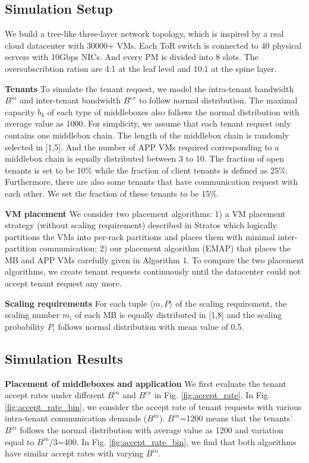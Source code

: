 \documentclass[review]{elsarticle}
\begin{document}
\subsection{Simulation Setup}
We build a tree-like three-layer network topology, which is inspired by a real cloud datacenter with 30000+ VMs. Each ToR switch is connected to 40 physical servers with 10Gbps NICs. And every PM is divided into 8 slots. The oversubscribtion ration are 4:1 at the leaf level and 10:1 at the spine layer.  

\textbf{Tenants} To simulate the tenant request, we model the intra-tenant bandwidth $B^{in}$ and inter-tenant bandwidth $B^{ex}$ to follow normal distribution. The maximal capacity $b_k$ of each type of middleboxes also follows the normal distribution with average value as 1000. For simplicity, we assume that each tenant request only contains one middlebox chain. The length of the middlebox chain is randomly selected in [1,5]. And the number of APP VMs required corresponding to a middlebox chain is equally distributed between 3 to 10. The fraction of open tenants is set to be 10\% while the fraction of client tenants is defined as 25\%. Furthermore, there are also some tenants that have communication request with each other. We set the fraction of these tenants to be 15\%.  

\textbf{VM placement} We consider two placement algorithms: 1) a VM placement strategy (without scaling requirement) described in Stratos \cite{stratos12} which logically partitions the VMs into per-rack partitions and places them with minimal inter-partition communication; 2) our placement algorithm (EMAP) that places the MB and APP VMs carefully given in Algorithm 1. To compare the two placement algorithms, we create tenant requests continuously until the datacenter could not accept tenant request any more.

\textbf{Scaling requirements} For each tuple $\langle m, P\rangle$ of the scaling requirement, the scaling number $m_i$ of each MB is equally distributed in [1,8] and the scaling probability $P_i$ follows normal distribution with mean value of 0.5. 
\subsection{Simulation Results}
\textbf{Placement of middleboxes and application} We first evaluate the tenant accept rates under different $B^{in}$ and $B^{ex}$ in Fig. \ref{fig:accept_rate}.
In Fig. \ref{fig:accept_rate_bin}, we consider 
the accept rate of tenant requests with various intra-tenant communication demands ($B^{in}$). $B^{in}$=1200 means that the tenants’ $B^{in}$ follows the normal distribution with average value as 1200 and variation equal to $B^{in}$/3=400. In Fig. \ref{fig:accept_rate_bin}, we find that both algorithms have similar accept rates with varying $B^{in}$. 
\end{document}
